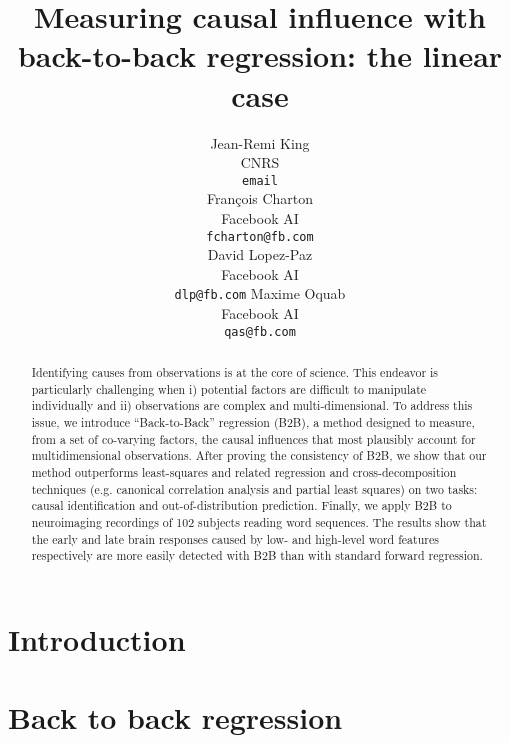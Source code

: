 \documentclass{article}
\title{Measuring causal influence with\\ back-to-back regression: the linear case}
\author{%
  Jean-Remi King\\
  CNRS\\
  \texttt{email} \\
  \And
  Fran\c{c}ois Charton\\
  Facebook AI\\
  \texttt{fcharton@fb.com}\\
  \And
  David Lopez-Paz\\
  Facebook AI\\
  \texttt{dlp@fb.com}
  \And
  Maxime Oquab\\
  Facebook AI\\
  \texttt{qas@fb.com}
}
\begin{document}
\maketitle

\begin{abstract}
Identifying causes from observations is at the core of science. This endeavor
is particularly challenging when i) potential factors are difficult to
manipulate individually and ii) observations are complex and multi-dimensional.
To address this issue, we introduce ``Back-to-Back'' regression (B2B), a
method designed to measure, from a set of co-varying factors, the causal
influences that most plausibly account for multidimensional observations. After
proving the consistency of B2B, we show that our method outperforms
least-squares and related regression and cross-decomposition techniques (e.g.
canonical correlation analysis and partial least squares) on two tasks: causal
identification and out-of-distribution prediction. Finally, we apply B2B to
neuroimaging recordings of 102 subjects reading word sequences. The results
show that the early and late brain responses caused by low- and high-level
word features respectively are more easily detected with B2B than with standard forward regression.
\end{abstract}

\section{Introduction}



\section{Back to back regression}
\label{sec:algorithm}
\end{document}
